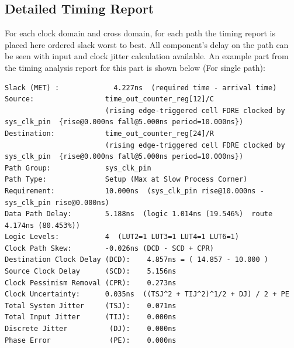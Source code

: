 \documentclass{report}
\newenvironment{narrowmargins}{
    \newgeometry{top=1in, bottom=1in, left=0.5in, right=0.5in}
}{\restoregeometry}
\begin{document}
\subsection{Detailed Timing Report}
For each clock domain and cross domain, for each path the timing report is placed here ordered slack worst to best. All component's delay on the path can be seen with input and clock jitter calculation available.
An example part from the timing analysis report for this part is shown below (For single path):

\begin{narrowmargins}
\begin{verbatim}
Slack (MET) :             4.227ns  (required time - arrival time)
Source:                 time_out_counter_reg[12]/C
                        (rising edge-triggered cell FDRE clocked by sys_clk_pin  {rise@0.000ns fall@5.000ns period=10.000ns})
Destination:            time_out_counter_reg[24]/R
                        (rising edge-triggered cell FDRE clocked by sys_clk_pin  {rise@0.000ns fall@5.000ns period=10.000ns})
Path Group:             sys_clk_pin
Path Type:              Setup (Max at Slow Process Corner)
Requirement:            10.000ns  (sys_clk_pin rise@10.000ns - sys_clk_pin rise@0.000ns)
Data Path Delay:        5.188ns  (logic 1.014ns (19.546%)  route 4.174ns (80.453%))
Logic Levels:           4  (LUT2=1 LUT3=1 LUT4=1 LUT6=1)
Clock Path Skew:        -0.026ns (DCD - SCD + CPR)
Destination Clock Delay (DCD):    4.857ns = ( 14.857 - 10.000 ) 
Source Clock Delay      (SCD):    5.156ns
Clock Pessimism Removal (CPR):    0.273ns
Clock Uncertainty:      0.035ns  ((TSJ^2 + TIJ^2)^1/2 + DJ) / 2 + PE
Total System Jitter     (TSJ):    0.071ns
Total Input Jitter      (TIJ):    0.000ns
Discrete Jitter          (DJ):    0.000ns
Phase Error              (PE):    0.000ns


\end{verbatim}
\end{narrowmargins}
\end{document}

